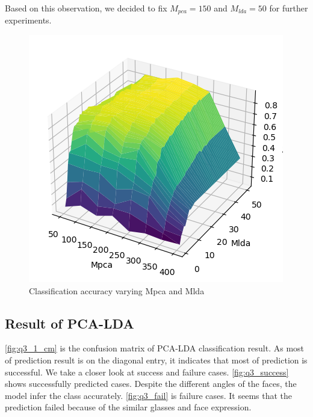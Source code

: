 Based on this observation, we decided to fix $M_{pca}=150$ and $M_{lda}=50$ for further experiments. 

\begin{figure}
  \centering
   \includegraphics[width=0.8\linewidth]{image/mpca_mlda.png}

   \caption{Classification accuracy varying Mpca and Mlda}
   \label{fig:mpca_mlda}
\end{figure}


\subsection{Result of PCA-LDA}

\cref{fig:q3_1_cm} is the confusion matrix of PCA-LDA classification result. As most of prediction result is on the diagonal entry, it indicates that most of prediction is successful. We take a closer look at success and failure cases. \cref{fig:q3_success} shows successfully predicted cases. Despite the different angles of the faces, the model infer the class accurately. \cref{fig:q3_fail} is failure cases. It seems that the prediction failed because of the similar glasses and face expression.



